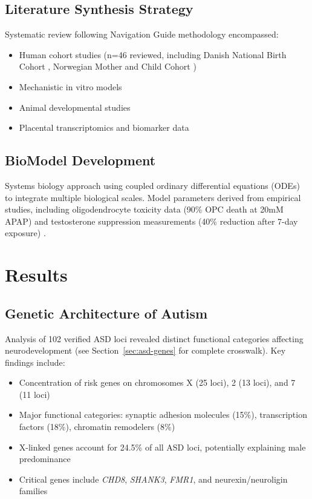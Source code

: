 \documentclass[12pt]{article}
\begin{document}
\subsection{Literature Synthesis Strategy}
Systematic review following Navigation Guide methodology \citep{navarro2025} encompassed:
\begin{itemize}
    \item Human cohort studies (n=46 reviewed, including Danish National Birth Cohort \citep{liew2016}, Norwegian Mother and Child Cohort \citep{brandlistuen2013,ystrom2017})
    \item Mechanistic in vitro models \citep{perez2012,posadas2019}
    \item Animal developmental studies \citep{viberg2014,philippot2022,blecharz2018}
    \item Placental transcriptomics and biomarker data \citep{ji2020}
\end{itemize}

\subsection{BioModel Development}
Systems biology approach using coupled ordinary differential equations (ODEs) to integrate multiple biological scales. Model parameters derived from empirical studies, including oligodendrocyte toxicity data (90\% OPC death at 20mM APAP) \citep{perez2012} and testosterone suppression measurements (40\% reduction after 7-day exposure) \citep{kristensen2016}.

\section{Results}

\subsection{Genetic Architecture of Autism}
Analysis of 102 verified ASD loci revealed distinct functional categories affecting neurodevelopment (see Section~\ref{sec:asd-genes} for complete crosswalk). Key findings include:
\begin{itemize}
    \item Concentration of risk genes on chromosomes X (25 loci), 2 (13 loci), and 7 (11 loci)
    \item Major functional categories: synaptic adhesion molecules (15\%), transcription factors (18\%), chromatin remodelers (8\%)
    \item X-linked genes account for 24.5\% of all ASD loci, potentially explaining male predominance
    \item Critical genes include \textit{CHD8}, \textit{SHANK3}, \textit{FMR1}, and neurexin/neuroligin families
\end{itemize}
\end{document}
